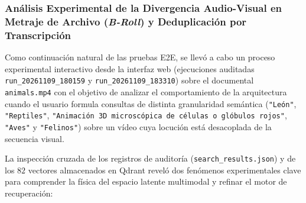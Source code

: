 \subsubsection{Análisis Experimental de la Divergencia Audio-Visual en Metraje de Archivo (\textit{B-Roll}) y Deduplicación por Transcripción}
\label{subsubsec:divergencia_broll_y_deduplicacion}

Como continuación natural de las pruebas E2E, se llevó a cabo un proceso experimental interactivo desde la interfaz web (ejecuciones auditadas \texttt{run\_20261109\_180159} y \texttt{run\_20261109\_183310}) sobre el documental \texttt{animals.mp4} con el objetivo de analizar el comportamiento de la arquitectura cuando el usuario formula consultas de distinta granularidad semántica (\texttt{\string"León\string"}, \texttt{\string"Reptiles\string"}, \texttt{\string"Animación 3D microscópica de células o glóbulos rojos\string"}, \texttt{\string"Aves\string"} y \texttt{\string"Felinos\string"}) sobre un vídeo cuya locución está desacoplada de la secuencia visual.

La inspección cruzada de los registros de auditoría (\texttt{search\_results.json}) y de los $82$ vectores almacenados en Qdrant reveló dos fenómenos experimentales clave para comprender la física del espacio latente multimodal y refinar el motor de recuperación:

